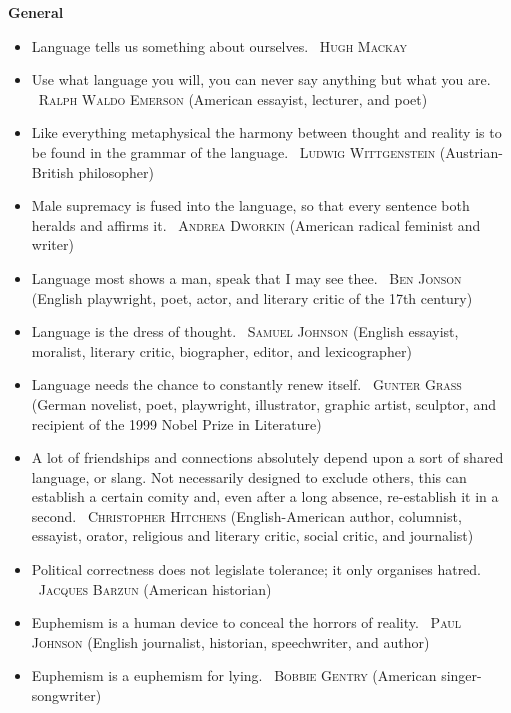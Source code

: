 \documentclass[10pt, a4paper]{article}
\newcommand{\heading}[1]{\textbf{#1}}
\newcommand{\linguist}[1]{\textemdash~\textsc{#1}}
\begin{document}
\begin{center}
  \Large \bfseries \scshape {} \normalsize \normalfont {}
\end{center}
\begin{multicols}{2}
  \heading{General}
  \begin{itemize}
    \item Language tells us something about ourselves. \linguist{Hugh Mackay}
    \item Use what language you will, you can never say anything but what you are. \linguist{Ralph Waldo Emerson} (American essayist, lecturer, and poet)
    \item Like everything metaphysical the harmony between thought and reality is to be found in the grammar of the language. \linguist{Ludwig Wittgenstein} (Austrian-British philosopher)
    \item Male supremacy is fused into the language, so that every sentence both heralds and affirms it. \linguist{Andrea Dworkin} (American radical feminist and writer)
    \item Language most shows a man, speak that I may see thee. \linguist{Ben Jonson} (English playwright, poet, actor, and literary critic of the 17th century)
    \item Language is the dress of thought. \linguist{Samuel Johnson} (English essayist, moralist, literary critic, biographer, editor, and lexicographer)
    \item Language needs the chance to constantly renew itself. \linguist{Gunter Grass} (German novelist, poet, playwright, illustrator, graphic artist, sculptor, and recipient of the 1999 Nobel Prize in Literature)
    \item A lot of friendships and connections absolutely depend upon a sort of shared language, or slang. Not necessarily designed to exclude others, this can establish a certain comity and, even after a long absence, re-establish it in a second. \linguist{Christopher Hitchens} (English-American author, columnist, essayist, orator, religious and literary critic, social critic, and journalist)
    \item Political correctness does not legislate tolerance; it only organises hatred. \linguist{Jacques Barzun} (American historian)
    \item Euphemism is a human device to conceal the horrors of reality. \linguist{Paul Johnson} (English journalist, historian, speechwriter, and author)
    \item Euphemism is a euphemism for lying. \linguist{Bobbie Gentry} (American singer-songwriter)

\end{itemize}
\end{multicols}
\end{document}

